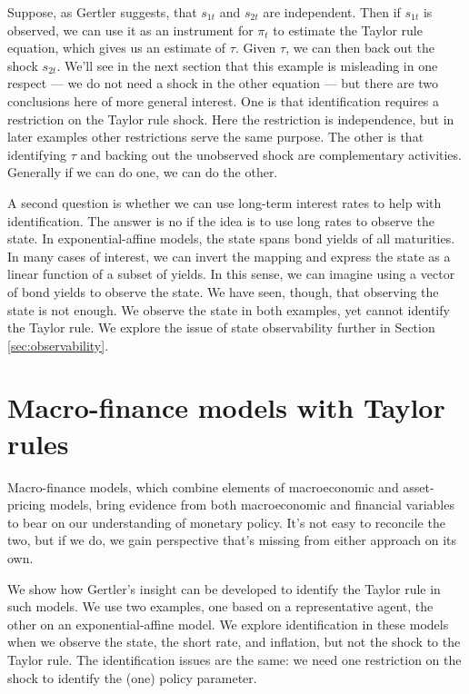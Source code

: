 \documentclass[11pt]{article}
\begin{document}
{Suppose, as Gertler suggests, that $s_{1t}$ and $s_{2t}$ are independent.
Then if $s_{1t}$ is observed,
we can use it as an instrument for $\pi_t$ to estimate the Taylor rule
equation, which gives us an estimate of $\tau$.
Given $\tau$, we can then back out the shock $s_{2t}$.
We'll see in the next section that this example is misleading
in one respect ---  we do not need a shock in the other equation ---
but there are two conclusions here of more general interest.
One is that identification requires a restriction on the Taylor rule shock.
Here the restriction is independence, but in later examples
other restrictions serve the same purpose.
The other is that identifying $\tau$
and backing out the unobserved shock are complementary activities.
Generally if we can do one, we can do the other.

A second question is whether we can use long-term interest rates to
help with identification.
The answer is no if the idea is to use long rates to observe the state.
In exponential-affine models, the state spans bond yields of all maturities.
In many cases of interest, we can invert the mapping and express
the state as a linear function of a subset of yields.
In this sense, we can imagine using a vector of bond yields
to observe the state.
%
We have seen, though, that observing the state is not enough.
We observe the state in both examples,
yet cannot identify the Taylor rule.
We explore the issue of state observability further in Section \ref{sec:observability}.


\section{Macro-finance models with Taylor rules}
\label{sec:macrofin}

Macro-finance models, which combine elements of
macroeconomic and asset-pricing models,
bring evidence from both macroeconomic and financial variables to bear
on our understanding of monetary policy.
It's not easy to reconcile the two,
but if we do, we gain perspective that's
missing from either approach on its own.

We show how Gertler's insight can be developed to identify
the Taylor rule in such models.
We use two examples, one based on a representative agent,
the other on an exponential-affine model.
We explore identification in these models when we observe the state,
the short rate, and inflation,
but not the shock to the Taylor rule.
The identification issues are the same:  we need one restriction on the shock
to identify the (one) policy parameter.


}
\end{document}
